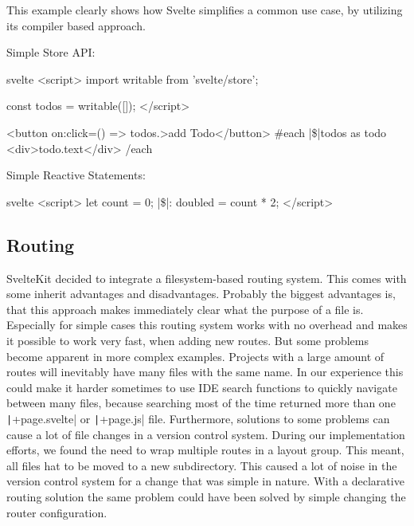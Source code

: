 This example clearly shows how Svelte simplifies a common use case, by utilizing its compiler based approach.

\todo{}

Simple Store API:
\begin{myminted}[escapeinside=||]{svelte}{}
<script>
    import { writable } from 'svelte/store';

    const todos = writable([]);
</script>

<button on:click={() => todos.}>add Todo</button>
{#each |\$|todos as todo}
    <div>{todo.text}</div>
{/each}
\end{myminted}

Simple Reactive Statements:
\begin{myminted}[escapeinside=||]{svelte}{}
<script>
    let count = 0;
    |\$|: doubled = count * 2;
</script>
\end{myminted}





\subsection{Routing}
SvelteKit decided to integrate a filesystem-based routing system. This comes with some inherit advantages and disadvantages. Probably the biggest advantages is, that this approach makes immediately clear what the purpose of a file is. Especially for simple cases this routing system works with no overhead and makes it possible to work very fast, when adding new routes. But some problems become apparent in more complex examples. Projects with a large amount of routes will inevitably have many files with the same name. In our experience this could make it harder sometimes to use IDE search functions to quickly navigate between many files, because searching most of the time returned more than one \texttt|+page.svelte| or \texttt|+page.js| file. Furthermore, solutions to some problems can cause a lot of file changes in a version control system. During our implementation efforts, we found the need to wrap multiple routes in a layout group. This meant, all files hat to be moved to a new subdirectory. This caused a lot of noise in the version control system for a change that was simple in nature. With a declarative routing solution the same problem could have been solved by simple changing the router configuration.

